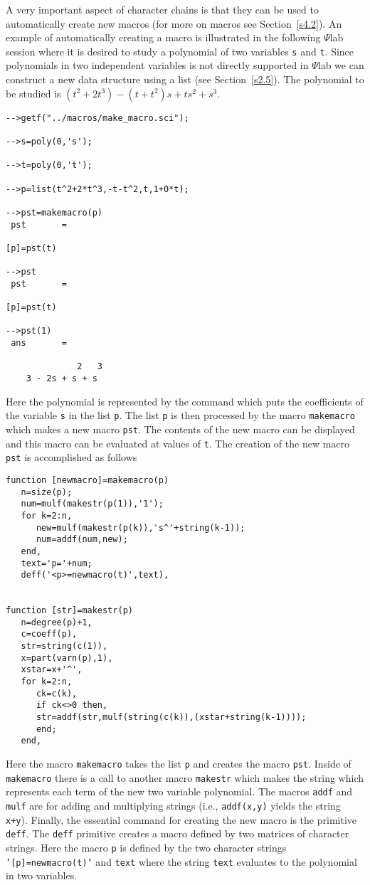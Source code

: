 	A very important aspect of character chains is that they
can be used to automatically create new macros (for more on macros
see Section~\ref{s4.2}).  An example of automatically creating a 
macro is illustrated in the following $\Psi$lab session where it is
desired to study a polynomial of two variables {\tt s} and {\tt t}.
Since polynomials in two independent variables is not directly 
supported in $\Psi$lab we can construct a new data structure using
a list (see Section~\ref{s2.5}).
The polynomial to be studied is $(t^2+2t^3)-(t+t^2)s+ts^2+s^3$.
\begin{verbatim}
-->getf("../macros/make_macro.sci");
 
-->s=poly(0,'s');
 
-->t=poly(0,'t');
 
-->p=list(t^2+2*t^3,-t-t^2,t,1+0*t);
 
-->pst=makemacro(p)
 pst       =
 
[p]=pst(t)
 
-->pst
 pst       =
 
[p]=pst(t)
 
-->pst(1)
 ans       =
 
              2   3  
    3 - 2s + s + s   
\end{verbatim}
Here the polynomial is represented by the command which puts
the coefficients of the variable {\tt s} in the list {\tt p}.
The list {\tt p} is then processed by the macro {\tt makemacro}
which makes a new macro {\tt pst}.  The contents of the new macro
can be displayed and this macro can be evaluated
at values of {\tt t}.  The creation of the new macro {\tt pst}
is accomplished as follows
\begin{verbatim}
function [newmacro]=makemacro(p)
   n=size(p);
   num=mulf(makestr(p(1)),'1');
   for k=2:n,
      new=mulf(makestr(p(k)),'s^'+string(k-1));
      num=addf(num,new);
   end,
   text='p='+num;
   deff('<p>=newmacro(t)',text),


function [str]=makestr(p)
   n=degree(p)+1,
   c=coeff(p),
   str=string(c(1)),
   x=part(varn(p),1),
   xstar=x+'^',
   for k=2:n, 
      ck=c(k), 
      if ck<>0 then,
      str=addf(str,mulf(string(c(k)),(xstar+string(k-1))));
      end;
   end,

\end{verbatim}
Here the macro {\tt makemacro} takes the list {\tt p} and creates the
macro {\tt pst}.  Inside of {\tt makemacro} there is a call to another 
macro {\tt makestr} which makes the string which represents each 
term of the new two variable polynomial.  The macros {\tt addf} and
{\tt mulf} are for adding and multiplying strings (i.e., 
{\tt addf(x,y)} yields the string {\tt x+y}).  Finally, the 
essential command for creating the new macro 
is the primitive {\tt deff}.  The {\tt deff} primitive 
creates a macro defined by two matrices
of character strings.  Here the 
macro {\tt p} is defined by the two character strings
{\tt '[p]=newmacro(t)'} and {\tt text} where the string {\tt text}
evaluates to the polynomial in two variables.

